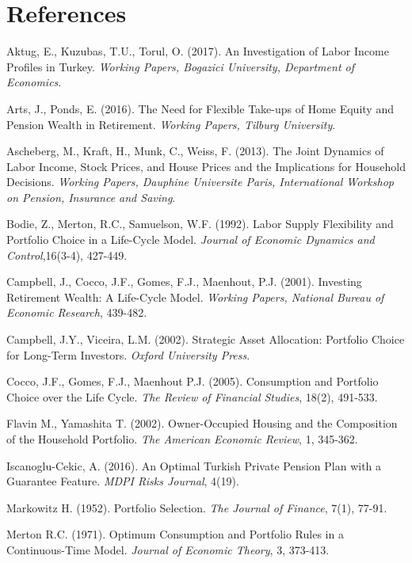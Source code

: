 \chapter*{References}

\begingroup
\singlespace
\begin{description}
\item Aktug, E., Kuzubas, T.U., Torul, O. (2017). An Investigation of Labor Income Profiles in Turkey. \textit{Working Papers, Bogazici University, Department of Economics}.
\item Arts, J., Ponds, E. (2016). The Need for Flexible Take-ups of Home Equity and Pension Wealth in Retirement. \textit{Working Papers, Tilburg University}.
\item Ascheberg, M., Kraft, H., Munk, C., Weiss, F. (2013). The Joint Dynamics of Labor Income, Stock Prices, and House Prices and the Implications for Household Decisions. \textit{Working Papers, Dauphine Universite Paris, International Workshop on Pension, Insurance and Saving}.
\item Bodie, Z., Merton, R.C., Samuelson, W.F. (1992). Labor Supply Flexibility and Portfolio Choice in a Life-Cycle Model. \textit{Journal of Economic Dynamics and Control},16(3-4), 427-449. 
\item Campbell, J., Cocco, J.F., Gomes, F.J., Maenhout, P.J. (2001). Investing Retirement Wealth: A Life-Cycle Model. \textit{Working Papers, National Bureau of Economic Research}, 439-482.
\item Campbell, J.Y., Viceira, L.M. (2002). Strategic Asset Allocation: Portfolio Choice for Long-Term Investors. \textit{Oxford University Press}.
\item Cocco, J.F., Gomes, F.J., Maenhout P.J. (2005). Consumption and Portfolio Choice over the Life Cycle. \textit{The Review of Financial Studies}, 18(2), 491-533. 
\item Flavin M., Yamashita T. (2002). Owner-Occupied Housing and the Composition of the Household Portfolio. \textit{The American Economic Review}, 1, 345-362.
\item Iscanoglu-Cekic, A. (2016). An Optimal Turkish Private Pension Plan with a Guarantee Feature. \textit{MDPI Risks Journal}, 4(19).
\item Markowitz H. (1952). Portfolio Selection. \textit{The Journal of Finance}, 7(1), 77-91.
\item Merton R.C. (1971). Optimum Consumption and Portfolio Rules in a Continuous-Time Model. \textit{Journal of Economic Theory}, 3, 373-413.

\end{description}
